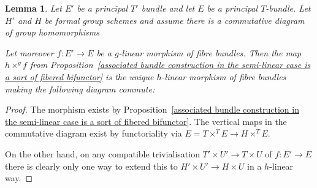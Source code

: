 \documentclass[10pt,oneside]{amsart}
\newtheorem{lemma}[theorem]{Lemma}
\theoremstyle{definition}
\theoremstyle{remark}
\begin{document}
	\begin{lemma}\label{universal property of associated fibre construction in the semilinear case}
		Let $E'$ be a principal $T'$ bundle and let $E$ be a principal $T$-bundle. Let $H'$ and $H$ be formal group schemes and assume there is a commutative diagram of group homomorphisms
		\begin{center}
		\end{center}
		Let moreover $f:E'\rightarrow E$ be a $g$-linear morphism of fibre bundles.
		Then the map $h\times^g f$ from Proposition~\ref{associated bundle construction in the semi-linear case is a sort of fibered bifunctor} is the unique $h$-linear morphism of fibre bundles making the following diagram commute:
		\begin{center}
		\end{center}
	\end{lemma}
	\begin{proof}
		The morphism exists by Proposition~\ref{associated bundle construction in the semi-linear case is a sort of fibered bifunctor}. The vertical maps in the commutative diagram exist by functoriality via $E=T\times^{T}E\rightarrow H\times^{T}E$. 
		
		On the other hand, on any compatible trivialisation $T'\times U'\rightarrow T\times U$ of $f:E'\rightarrow E$ there is clearly only one way to extend this to $H'\times U'\rightarrow H\times U$ in a $h$-linear way.
	\end{proof}
	
\end{document}
